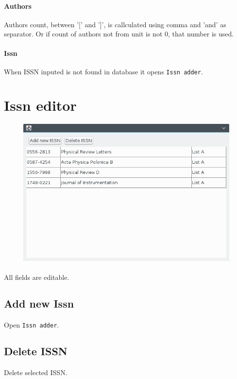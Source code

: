 \documentclass[a4paper,10pt]{article}
\begin{document}
\paragraph{Authors} Authors count, between '[' and ']', is callculated using comma and 'and' as separator. Or if count of authors not from unit is not 0, that number is used.
\paragraph{Issn} When ISSN inputed is not found in database it opens \texttt{Issn adder}.

\section{Issn editor}
\begin{figure}[H]
 \centering
 \includegraphics[width=35em]{kpub-issn-editor.png}
\end{figure}
\paragraph{}All fields are editable.
\subsection{Add new Issn}
\paragraph{}Open \texttt{Issn adder}.
\subsection{Delete ISSN}
\paragraph{}Delete selected ISSN.
\end{document}
